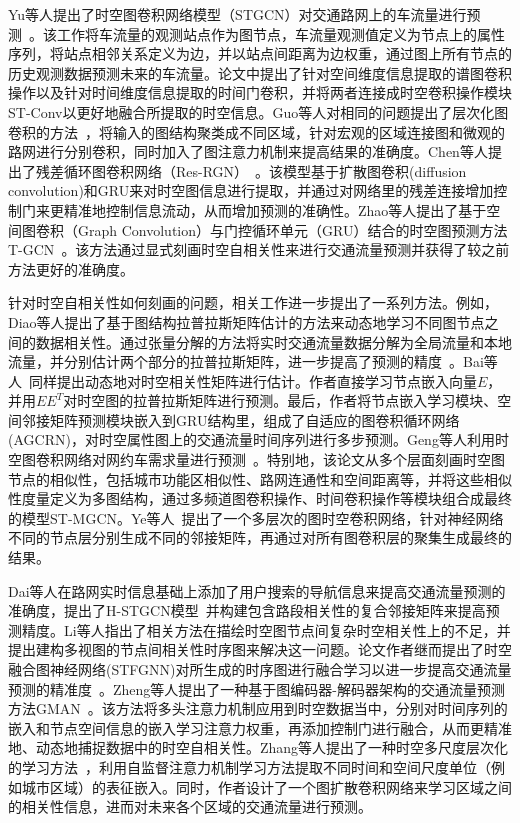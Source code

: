 \documentclass[12pt,UTF8,AutoFakeBold=2,a4paper]{ctexart} %
\begin{document}
Yu等人提出了时空图卷积网络模型（STGCN）对交通路网上的车流量进行预测~\cite{yu2018spatio}。该工作将车流量的观测站点作为图节点，车流量观测值定义为节点上的属性序列，将站点相邻关系定义为边，并以站点间距离为边权重，通过图上所有节点的历史观测数据预测未来的车流量。论文中提出了针对空间维度信息提取的谱图卷积操作以及针对时间维度信息提取的时间门卷积，并将两者连接成时空卷积操作模块ST-Conv以更好地融合所提取的时空信息。Guo等人对相同的问题提出了层次化图卷积的方法~\cite{Guo19attention}，将输入的图结构聚类成不同区域，针对宏观的区域连接图和微观的路网进行分别卷积，同时加入了图注意力机制来提高结果的准确度。Chen等人提出了残差循环图卷积网络（Res-RGN）~\cite{chen2019gated}。该模型基于扩散图卷积(diffusion convolution)和GRU来对时空图信息进行提取，并通过对网络里的残差连接增加控制门来更精准地控制信息流动，从而增加预测的准确性。Zhao等人提出了基于空间图卷积（Graph Convolution）与门控循环单元（GRU）结合的时空图预测方法T-GCN~\cite{zhao2019t}。该方法通过显式刻画时空自相关性来进行交通流量预测并获得了较之前方法更好的准确度。

针对时空自相关性如何刻画的问题，相关工作进一步提出了一系列方法。例如，Diao等人提出了基于图结构拉普拉斯矩阵估计的方法来动态地学习不同图节点之间的数据相关性。通过张量分解的方法将实时交通流量数据分解为全局流量和本地流量，并分别估计两个部分的拉普拉斯矩阵，进一步提高了预测的精度~\cite{diao2019dynamic}。Bai等人~\cite{bai2020adaptive}同样提出动态地对时空相关性矩阵进行估计。作者直接学习节点嵌入向量$E$，并用$EE^T$对时空图的拉普拉斯矩阵进行预测。最后，作者将节点嵌入学习模块、空间邻接矩阵预测模块嵌入到GRU结构里，组成了自适应的图卷积循环网络(AGCRN)，对时空属性图上的交通流量时间序列进行多步预测。Geng等人利用时空图卷积网络对网约车需求量进行预测~\cite{geng2019spatiotemporal}。特别地，该论文从多个层面刻画时空图节点的相似性，包括城市功能区相似性、路网连通性和空间距离等，并将这些相似性度量定义为多图结构，通过多频道图卷积操作、时间卷积操作等模块组合成最终的模型ST-MGCN。Ye等人~\cite{ye2021coupled}提出了一个多层次的图时空卷积网络，针对神经网络不同的节点层分别生成不同的邻接矩阵，再通过对所有图卷积层的聚集生成最终的结果。

Dai等人在路网实时信息基础上添加了用户搜索的导航信息来提高交通流量预测的准确度，提出了H-STGCN模型~\cite{dai2020hybrid}并构建包含路段相关性的复合邻接矩阵来提高预测精度。Li等人指出了相关方法在描绘时空图节点间复杂时空相关性上的不足，并提出建构多视图的节点间相关性时序图来解决这一问题。论文作者继而提出了时空融合图神经网络(STFGNN)对所生成的时序图进行融合学习以进一步提高交通流量预测的精准度~\cite{li2021spatial}。Zheng等人提出了一种基于图编码器-解码器架构的交通流量预测方法GMAN~\cite{zheng2020gman}。该方法将多头注意力机制应用到时空数据当中，分别对时间序列的嵌入和节点空间信息的嵌入学习注意力权重，再添加控制门进行融合，从而更精准地、动态地捕捉数据中的时空自相关性。Zhang等人提出了一种时空多尺度层次化的学习方法~\cite{zhang2021traffic}，利用自监督注意力机制学习方法提取不同时间和空间尺度单位（例如城市区域）的表征嵌入。同时，作者设计了一个图扩散卷积网络来学习区域之间的相关性信息，进而对未来各个区域的交通流量进行预测。
\end{document}
